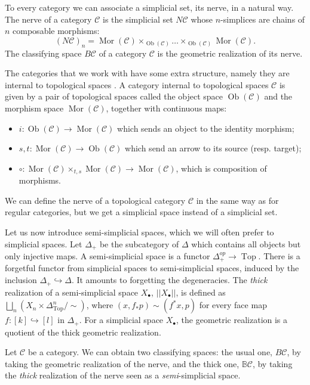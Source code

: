 \documentclass[12pt]{amsart}
\theoremstyle{plain}
\theoremstyle{definition}
\theoremstyle{remark}
\DeclareMathOperator{\Mor}{Mor}
\DeclareMathOperator{\Ob}{Ob}
\DeclareMathOperator{\Top}{Top}
\newcommand{\C}{\mathcal{C}}
\begin{document}
To every category we can associate a simplicial set, its nerve, in a natural way.\\
The nerve of a category $\C$ is the simplicial set $N\C$ whose $n$-simplices are chains of $n$ composable morphisms:
\[(N\C)_n = \Mor(\C)\times_{\Ob(\C)} \dots \times_{\Ob(\C)} \Mor(\C).\]
The classifying space $B\C$ of a category $\C$ is the geometric realization of its nerve.

The categories that we work with have some extra structure, namely they are internal to topological spaces \cite{segal68}.
A category internal to topological spaces $\C$ is given by a pair of topological spaces called the object space $\Ob(\C)$ and the morphism space $\Mor(\C)$, 
together with continuous maps:
\begin{itemize}
    \item $i:\Ob(\C)\rightarrow \Mor(\C)$ which sends an object to the identity morphism;
    \item $s,t:\Mor(\C)\rightarrow \Ob(\C)$ which send an arrow to its source (resp. target);
    \item $\circ:\Mor(\C)\times_{t,s}\Mor(\C)\rightarrow \Mor(\C)$, which is composition of morphisms.
\end{itemize}
We can define the nerve of a topological category $\C$ in the same way as for regular categories, but we get a simplicial space instead of a simplicial set.

Let us now introduce semi-simplicial spaces, which we will often prefer to simplicial spaces.
Let $\Delta_+$ be the subcategory of $\Delta$ which contains all objects but only injective maps.
A semi-simplicial space is a functor $\Delta_+^{op}\rightarrow \Top$.
There is a forgetful functor from simplicial spaces to semi-simplicial spaces, induced by the inclusion $\Delta_+\hookrightarrow \Delta$. It amounts to forgetting the degeneracies. %
The \textit{thick} realization of a semi-simplicial space $X_\bullet$, $\vert\vert X_\bullet \vert\vert$, is defined as $ \bigsqcup_n \left(X_n\times \Delta^n_{\Top}/\sim\right)$, where $(x, f_*p)\sim (f^*x,p)$ for every face map $f:[k]\hookrightarrow [l]$ in $\Delta_+$.
For a simplicial space $X_\bullet$, the geometric realization is a quotient of the thick geometric realization.

Let $\C$ be a category. We can obtain two classifying spaces: the usual one, $B\C$, by taking the geometric realization of the nerve, and the thick one, $\mathbb{B}\C$, by taking the \emph{thick} realization of the nerve seen as a \emph{semi}-simplicial space.
\end{document}
